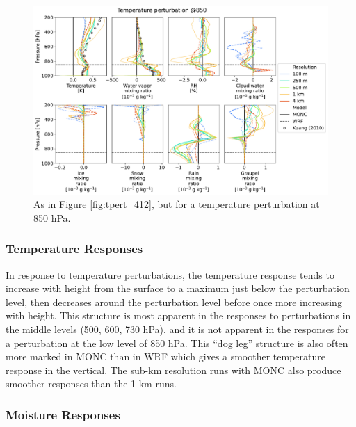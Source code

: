 \documentclass[draft]{agujournal2019}
\begin{document}
\begin{figure}[pth]
    \noindent\includegraphics[width=\textwidth]{figures/pert_diffs_T_0.5_@850}
    \caption{As in Figure \ref{fig:tpert_412}, but for a temperature
    perturbation at 850 hPa.}
    \label{fig:tpert_850}
\end{figure}

\subsubsection{Temperature Responses}

In response to temperature perturbations, the temperature response tends to
increase with height from the surface to a maximum just below the perturbation
level, then decreases around the perturbation level before once more increasing
with height. This structure is most apparent in the responses to perturbations
in the middle levels (500, 600, 730 hPa), and it is not apparent in the
responses for a perturbation at the low level of 850 hPa. This ``dog leg''
structure is also often more marked in MONC than in WRF which gives a smoother
temperature response in the vertical. The sub-km resolution runs with MONC also
produce smoother responses than the 1 km runs.

\subsubsection{Moisture Responses}
\end{document}
